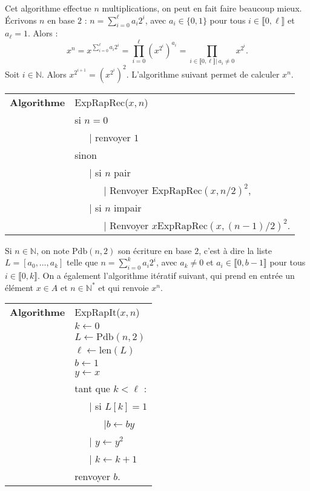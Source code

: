 \documentclass[12pt]{report}
\newcommand{\N}{\mathbb{N}}
\begin{document}
 
 Cet algorithme effectue $n$ multiplications, on peut en fait faire beaucoup mieux. Écrivons $n$ en base $2$ : $n=\sum_{i=0}^\ell a_i 2^i$, avec $a_i\in \{0,1\}$ pour tous $i\in \llbracket 0,\ell\rrbracket$ et $a_\ell =1$. Alors : \[x^n=x^{\sum_{i=0}^\ell a_i 2^i}=\prod_{i=0}^\ell (x^{2^i})^{a_i}=\prod_{i\in \llbracket 0,\ell\rrbracket |\ a_i\neq 0} x^{2^i} .\] Soit $i\in \N$. Alors $x^{2^{i+1}}=(x^{2^i})^2$. L'algorithme suivant permet de calculer $x^n$.
 
  
 \begin{tabular}{ll}
\textbf{Algorithme } & ExpRapRec($x,n$)\\
& si $n=0$\\
& \ \ \ {\rm |} renvoyer $1$\\
& sinon\\
& \ \ \ {\rm |} si $n$ pair\\
& \ \ \ \ \ \ {\rm |} Renvoyer $\mathrm{ExpRapRec}(x,n/2)^2$,\\
& \ \ \ {\rm |} si $n$ impair\\
& \ \ \ \ \ \ {\rm |} Renvoyer $x\mathrm{ExpRapRec}(x,(n-1)/2)^2$.\\
\end{tabular}
 
Si $n\in \N$, on note $\mathrm{Pdb}(n,2)$ son écriture en base $2$, c'est à dire la liste $L=[a_0,\ldots,a_k]$ telle que $n=\sum_{i=0}^k a_i 2^i$, avec $a_k\neq 0$ et $a_i\in\llbracket 0,b-1\rrbracket$ pour tous $i\in \llbracket 0,k\rrbracket$. On a également l'algorithme itératif suivant, qui prend en entrée un élément $x\in A$ et $n\in \N^*$ et qui renvoie $x^n$.
 
 \begin{tabular}{ll}
\textbf{Algorithme } & ExpRapIt($x,n$)\\

& $k\leftarrow 0$ \\
& $L\leftarrow \mathrm{Pdb}(n,2)$\\
&$\ell\leftarrow \mathrm{len}(L)$\\
& $b\leftarrow 1$ \\
& $y\leftarrow x$ \\
& tant que $k<\ell$ :\\
& \ \ \ {\rm |} si $L[k]= 1$\\
& \ \ \ \ \ \ {\rm |}$b\leftarrow by$\\
& \ \ \ {\rm |} $y\leftarrow y^2$\\

& \ \ \ {\rm |} $k\leftarrow k+1$  \\
& renvoyer $b$.
\end{tabular}
\end{document}
